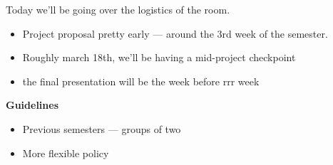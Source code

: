 Today we'll be going over the logistics of the room.

\begin{itemize}
    \item Project proposal pretty early --- around the 3rd week of the semester.
    \item Roughly march 18th, we'll be having a mid-project checkpoint
    \item the final presentation will be the week before rrr week
\end{itemize}

\textbf{Guidelines}

\begin{itemize}
    \item Previous semesters --- groups of two
    \item More flexible policy
\end{itemize}

